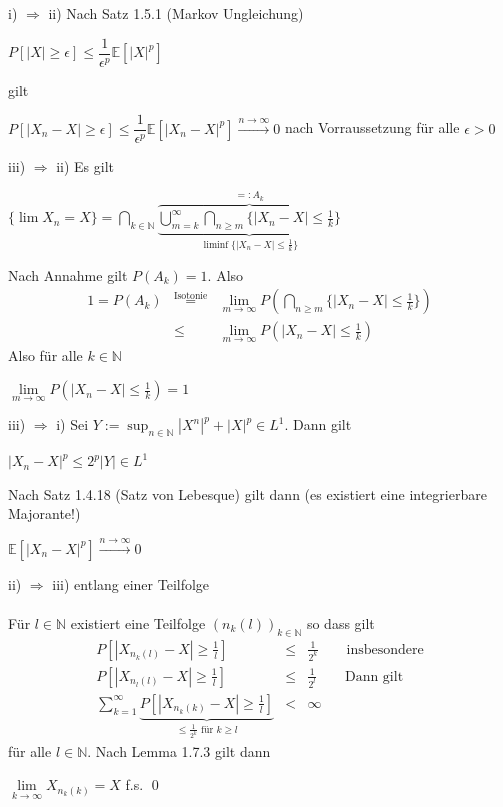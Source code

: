 \documentclass[10pt,a4paper]{report}
\newcommand{\E}{\mathbb{E}}
\newcommand{\N}{\mathbb{N}}
\numberwithin{equation}{section}
\numberwithin{figure}{section}
\theoremstyle{plain}
\theoremstyle{definition}
\theoremstyle{plain}
\theoremstyle{definition}
\theoremstyle{remark}
\theoremstyle{plain}
\theoremstyle{plain}
\theoremstyle{plain}
\theoremstyle{plain}
\theoremstyle{plain}
\newcommand{\1}{ \mathbb{1} } %
\begin{document}
i) $\Rightarrow$ ii) Nach Satz 1.5.1 (Markov Ungleichung)
\begin{center}
$P[|X|\geq \epsilon] \leq \dfrac{1}{\epsilon^p}\E[|X|^p]$
\end{center}
gilt
\begin{center}
$P[|X_n-X|\geq \epsilon] \leq \dfrac{1}{\epsilon^p} \E[|X_n-X|^p] \overset{n \to \infty}{\to} 0$ nach Vorraussetzung für alle $\epsilon>0$
\end{center}
iii) $\Rightarrow$ ii) Es gilt 
\begin{center}
$\{\lim X_n=X\}=\bigcap\limits_{k \in \N}\underbrace{\overbrace{\bigcup\limits_{m=k}^\infty\bigcap\limits_{n\geq m} \{|X_n-X|\leq \frac{1}{k}\}}}^{=:A_k}_{\liminf \{|X_n-X|\leq \frac{1}{k}\}}$
\end{center}
Nach Annahme gilt $P(A_k)=1$. Also
\begin{eqnarray*}
1=P(A_k)&\overset{\text{Isotonie}}{=}& \lim\limits_{m \to \infty} P(\bigcap\limits_{n\geq m}\{|X_n-X|\leq \frac{1}{k}\})\\
&\leq& \lim\limits_{m \to \infty} P(|X_n-X|\leq \frac{1}{k})
\end{eqnarray*}
Also für alle $k \in \N$
\begin{center}
$\lim\limits_{m \to \infty} P(|X_n-X|\leq\frac{1}{k})=1$
\end{center}
iii) $\Rightarrow$ i) Sei $Y:=\sup_{n \in \N}|X^n|^p+|X|^p \in L^1$. Dann gilt
\begin{center}
$|X_n-X|^p\leq 2^p|Y| \in L^1$
\end{center}
Nach Satz 1.4.18 (Satz von Lebesque) gilt dann (es existiert eine integrierbare Majorante!)
\begin{center}
$\E[|X_n-X|^p]\overset{n \to \infty}{\to} 0$
\end{center}
ii) $\Rightarrow$ iii) entlang einer Teilfolge\\\\
Für $l \in \N$ existiert eine Teilfolge $(n_k(l))_{k \in \N}$ so dass gilt
\begin{eqnarray*}
P[|X_{n_k(l)}-X|\geq \frac{1}{l}] &\leq& \frac{1}{2^k} \qquad \text{insbesondere}\\
P[|X_{n_l(l)}-X|\geq \frac{1}{l}] &\leq& \frac{1}{2^l} \qquad \text{Dann gilt}\\
\sum\limits_{k=1}^\infty \underbrace{P[|X_{n_k(k)}-X|\geq \frac{1}{l}]}_{\leq \frac{1}{2^k} \text{ für } k \geq l} &<& \infty
\end{eqnarray*}
für alle $l \in \N$. Nach Lemma 1.7.3 gilt dann 
\begin{center}
$\lim\limits_{k \to \infty} X_{n_k(k)}=X$ f.s. \qed
\end{center}
\end{document}
